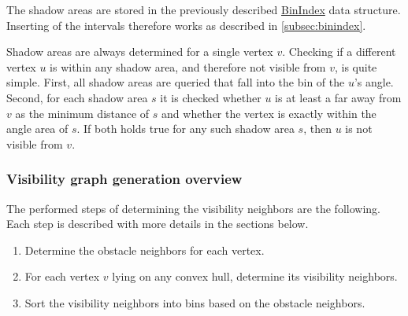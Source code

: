 			The shadow areas are stored in the previously described \hyperref[subsec:binindex]{BinIndex} data structure.
			Inserting of the intervals therefore works as described in \cref{subsec:binindex}.
			
			Shadow areas are always determined for a single vertex $v$.
			Checking if a different vertex $u$ is within any shadow area, and therefore not visible from $v$, is quite simple.
			First, all shadow areas are queried that fall into the bin of the $u$'s angle.
			Second, for each shadow area $s$ it is checked whether $u$ is at least a far away from $v$ as the minimum distance of $s$ and whether the vertex is exactly within the angle area of $s$.
			If both holds true for any such shadow area $s$, then $u$ is not visible from $v$.
		
		\subsubsection{Visibility graph generation overview}
		
			The performed steps of determining the visibility neighbors are the following.
			Each step is described with more details in the sections below.
			\begin{enumerate}[leftmargin=2.25em+\widthof{2.},label={2.\arabic*.}]
				\item Determine the obstacle neighbors for each vertex.
				\item For each vertex $v$ lying on any convex hull, determine its visibility neighbors.
				\item Sort the visibility neighbors into bins based on the obstacle neighbors.
			\end{enumerate}
		

